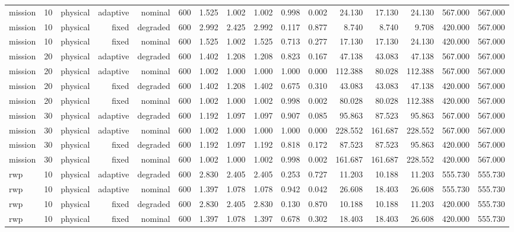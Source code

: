 \begin{tabular}{lrrrrrrrrrrrrrrr}
mission & 10 & physical & adaptive & nominal & 600 & 1.525 & 1.002 & 1.002 & 0.998 & 0.002 & 24.130 & 17.130 & 24.130 & 567.000 & 567.000 \\
mission & 10 & physical & fixed & degraded & 600 & 2.992 & 2.425 & 2.992 & 0.117 & 0.877 & 8.740 & 8.740 & 9.708 & 420.000 & 567.000 \\
mission & 10 & physical & fixed & nominal & 600 & 1.525 & 1.002 & 1.525 & 0.713 & 0.277 & 17.130 & 17.130 & 24.130 & 420.000 & 567.000 \\
mission & 20 & physical & adaptive & degraded & 600 & 1.402 & 1.208 & 1.208 & 0.823 & 0.167 & 47.138 & 43.083 & 47.138 & 567.000 & 567.000 \\
mission & 20 & physical & adaptive & nominal & 600 & 1.002 & 1.000 & 1.000 & 1.000 & 0.000 & 112.388 & 80.028 & 112.388 & 567.000 & 567.000 \\
mission & 20 & physical & fixed & degraded & 600 & 1.402 & 1.208 & 1.402 & 0.675 & 0.310 & 43.083 & 43.083 & 47.138 & 420.000 & 567.000 \\
mission & 20 & physical & fixed & nominal & 600 & 1.002 & 1.000 & 1.002 & 0.998 & 0.002 & 80.028 & 80.028 & 112.388 & 420.000 & 567.000 \\
mission & 30 & physical & adaptive & degraded & 600 & 1.192 & 1.097 & 1.097 & 0.907 & 0.085 & 95.863 & 87.523 & 95.863 & 567.000 & 567.000 \\
mission & 30 & physical & adaptive & nominal & 600 & 1.002 & 1.000 & 1.000 & 1.000 & 0.000 & 228.552 & 161.687 & 228.552 & 567.000 & 567.000 \\
mission & 30 & physical & fixed & degraded & 600 & 1.192 & 1.097 & 1.192 & 0.818 & 0.172 & 87.523 & 87.523 & 95.863 & 420.000 & 567.000 \\
mission & 30 & physical & fixed & nominal & 600 & 1.002 & 1.000 & 1.002 & 0.998 & 0.002 & 161.687 & 161.687 & 228.552 & 420.000 & 567.000 \\
rwp & 10 & physical & adaptive & degraded & 600 & 2.830 & 2.405 & 2.405 & 0.253 & 0.727 & 11.203 & 10.188 & 11.203 & 555.730 & 555.730 \\
rwp & 10 & physical & adaptive & nominal & 600 & 1.397 & 1.078 & 1.078 & 0.942 & 0.042 & 26.608 & 18.403 & 26.608 & 555.730 & 555.730 \\
rwp & 10 & physical & fixed & degraded & 600 & 2.830 & 2.405 & 2.830 & 0.130 & 0.870 & 10.188 & 10.188 & 11.203 & 420.000 & 555.730 \\
rwp & 10 & physical & fixed & nominal & 600 & 1.397 & 1.078 & 1.397 & 0.678 & 0.302 & 18.403 & 18.403 & 26.608 & 420.000 & 555.730 \\

\end{tabular}
